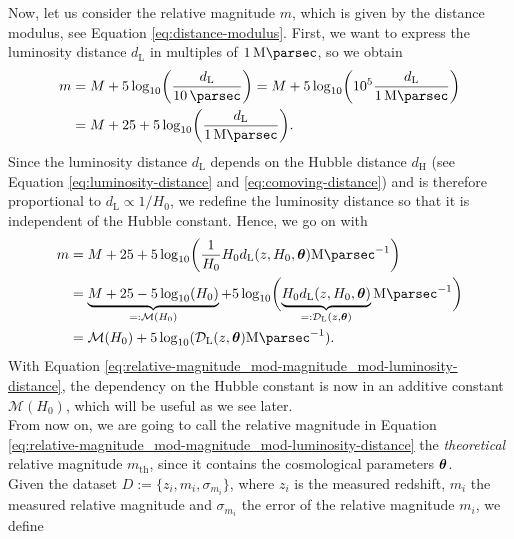 Now, let us consider the relative magnitude $m$, which is given by the distance modulus, see Equation \eqref{eq:distance-modulus}. First, we want to express the luminosity distance $d_{\text{L}}$ in multiples of $\SI{1}{\mega \parsec}$, so we obtain
\begin{align*}
    m &= M + 5\log_{10}\biggl( \frac{d_{\text{L}}}{\SI{10}{\parsec}} \biggr) = M + 5\log_{10}\biggl( 10^{5} \frac{d_{\text{L}}}{\SI{1}{\mega \parsec}} \biggr) \\
      &= M + 25 + 5\log_{10}\biggl(\frac{d_{\text{L}}}{\SI{1}{\mega \parsec}}\biggr). 
\end{align*}
Since the luminosity distance $d_{\text{L}}$ depends on the Hubble distance $d_{\text{H}}$ (see Equation \eqref{eq:luminosity-distance} and \eqref{eq:comoving-distance}) and is therefore proportional to $d_{\text{L}} \propto 1/H_{0}$, we redefine the luminosity distance so that it is independent of the Hubble constant. Hence, we go on with 
\begin{align}
m &= M + 25 + 5\log_{10} \biggl(\frac{1}{H_{0}} H_{0} d_{\text{L}}(z, H_{0}, \vb*{\theta}) \SI{}{\mega \parsec^{-1}} \biggr) \nonumber \\
  &= \underbrace{M + 25 - 5\log_{10}(H_{0})}_{ =: \mathcal{M}(H_{0}) } + 5 \log_{10} \biggl( \underbrace{H_{0} d_{\text{L}}(z, H_{0}, \vb*{\theta})}_{ =: \mathcal{D}_{\text{L}}(z, \vb*{\theta}) } \SI{}{\mega \parsec^{-1}} \biggr) \nonumber \\
  &= \mathcal{M}(H_{0}) + 5 \log_{10}(\mathcal{D}_{\text{L}}(z, \vb*{\theta}) \SI{}{\mega \parsec^{-1}}). \label{eq:relative-magnitude_mod-magnitude_mod-luminosity-distance}
\end{align}
With Equation \eqref{eq:relative-magnitude_mod-magnitude_mod-luminosity-distance}, the dependency on the Hubble constant is now in an additive constant $\mathcal{M}(H_{0})$, which will be useful as we see later. \\

\noindent From now on, we are going to call the relative magnitude in Equation \eqref{eq:relative-magnitude_mod-magnitude_mod-luminosity-distance} the \textit{theoretical} relative magnitude $m_{\text{th}}$, since it contains the cosmological parameters $\vb*{\theta}$. \\ 

\noindent Given the dataset $D := \{z_{i}, m_{i}, \sigma_{m_{i}} \}$, where $z_{i}$ is the measured redshift, $m_{i}$ the measured relative magnitude and $\sigma_{m_{i}}$ the error of the relative magnitude $m_{i}$, we define 


